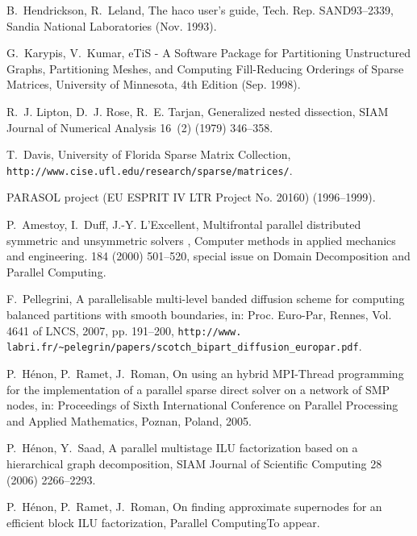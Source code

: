 \documentclass[fleqn,12pt,twoside]{article}
\newcommand{\lbt}{\linebreak[2]}
\begin{document}
\begin{thebibliography}{10}
B.~Hendrickson, R.~Leland, The {haco} user's guide, Tech. Rep.
  SAND93--2339, {S}andia {N}ational {L}aboratories (Nov. 1993).

G.~Karypis, V.~Kumar, {e{T}i{S}} - A Software Package for Partitioning
  Unstructured Graphs, Partitioning Meshes, and Computing Fill-Reducing
  Orderings of Sparse Matrices, University of Minnesota, 4th Edition (Sep.
  1998).

R.~J. Lipton, D.~J. Rose, R.~E. Tarjan, Generalized nested dissection, {SIAM}
  Journal of Numerical Analysis 16~(2) (1979) 346--358.

T.~Davis, {U}niversity of {F}lorida {S}parse {M}atrix {C}ollection, {\tt
  http://\lbt www.\lbo cise.\lbt ufl.\lbo edu/\lbt research/\lbt sparse/\lbt
  matrices/}.

{PARASOL} project ({EU} {ESPRIT} {IV} {LTR} {P}roject {N}o. 20160)
  (1996--1999).

P.~Amestoy, I.~Duff, J.-Y. L'Excellent, {Multifrontal parallel distributed
  symmetric and unsymmetric solvers }, Computer methods in applied mechanics
  and engineering. 184 (2000) 501--520, special issue on Domain Decomposition
  and Parallel Computing.

F.~Pellegrini, A parallelisable multi-level banded diffusion scheme for
  computing balanced partitions with smooth boundaries, in: Proc\@. Euro-Par,
  Rennes, Vol. 4641 of LNCS, 2007, pp. 191--200, {\tt http://\lbt www.\lbo
  labri.\lbo fr/\lbt \~{}pelegrin/\lbt papers/\lbt scotch\_\lbt bipart\_\lbt
  diffusion\_\lbt europar\lbt 2007.\lbt pdf}.

P.~H\'enon, P.~Ramet, J.~Roman, On using an hybrid {MPI-Thread} programming for
  the implementation of a parallel sparse direct solver on a network of {SMP}
  nodes, in: Proceedings of Sixth International Conference on Parallel
  Processing and Applied Mathematics, Poznan, Poland, 2005.

P.~H\'enon, Y.~Saad, A parallel multistage {ILU} factorization based on a
  hierarchical graph decomposition, {SIAM} {J}ournal of {S}cientific
  {C}omputing 28 (2006) 2266--2293.

P.~H\'enon, P.~Ramet, J.~Roman, On finding approximate supernodes for an
  efficient block {ILU} factorization, Parallel ComputingTo appear.

\end{thebibliography}
\end{document}
